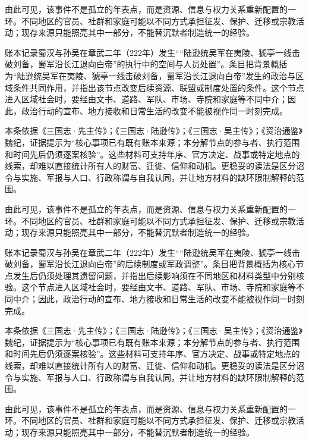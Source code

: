 由此可见，该事件不是孤立的年表点，而是资源、信息与权力关系重新配置的一环。不同地区的官员、社群和家庭可能以不同方式承担征发、保护、迁移或宗教活动；现存来源只能照亮其中一部分，不能替沉默者制造统一的经验。

账本记录蜀汉与孙吴在章武二年（222年）发生““陆逊统吴军在夷陵、猇亭一线击破刘备，蜀军沿长江退向白帝”的执行中的空间与人员处置”。条目把背景概括为“陆逊统吴军在夷陵、猇亭一线击破刘备，蜀军沿长江退向白帝”发生的政治与区域条件共同作用，并指出该节点改变后续资源、联盟或制度处置的条件。这个节点进入区域社会时，要经由文书、道路、军队、市场、寺院和家庭等不同中介；因此，政治行动的宣布、地方接收和日常生活的改变不能被视作同一时刻完成。

本条依据《三国志·先主传》；《三国志·陆逊传》；《三国志·吴主传》；《资治通鉴》魏纪，证据提示为“核心事项已有既有账本来源；本分解节点的参与者、执行范围和时间先后仍须逐案核验”。这些材料可支持年序、官方决定、战事或特定地点的线索，却难以直接统计所有人的财富、迁徙、信仰和动机。更稳妥的读法是区分诏令与实施、军报与人口、行政称谓与自我认同，并让地方材料的缺环限制解释的范围。

由此可见，该事件不是孤立的年表点，而是资源、信息与权力关系重新配置的一环。不同地区的官员、社群和家庭可能以不同方式承担征发、保护、迁移或宗教活动；现存来源只能照亮其中一部分，不能替沉默者制造统一的经验。

账本记录蜀汉与孙吴在章武二年（222年）发生““陆逊统吴军在夷陵、猇亭一线击破刘备，蜀军沿长江退向白帝”的后续制度或军政调整”。条目把背景概括为核心节点发生后仍须处理其遗留问题，并指出后续影响须在不同地区和材料类型中分别核验。这个节点进入区域社会时，要经由文书、道路、军队、市场、寺院和家庭等不同中介；因此，政治行动的宣布、地方接收和日常生活的改变不能被视作同一时刻完成。

本条依据《三国志·先主传》；《三国志·陆逊传》；《三国志·吴主传》；《资治通鉴》魏纪，证据提示为“核心事项已有既有账本来源；本分解节点的参与者、执行范围和时间先后仍须逐案核验”。这些材料可支持年序、官方决定、战事或特定地点的线索，却难以直接统计所有人的财富、迁徙、信仰和动机。更稳妥的读法是区分诏令与实施、军报与人口、行政称谓与自我认同，并让地方材料的缺环限制解释的范围。

由此可见，该事件不是孤立的年表点，而是资源、信息与权力关系重新配置的一环。不同地区的官员、社群和家庭可能以不同方式承担征发、保护、迁移或宗教活动；现存来源只能照亮其中一部分，不能替沉默者制造统一的经验。

